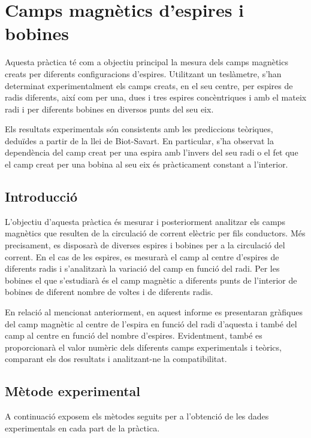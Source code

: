 \chapter{Camps magnètics d'espires i bobines}
\begin{resum}
	Aquesta pràctica té com a objectiu principal la mesura dels camps magnètics creats per diferents configuracions d'espires. Utilitzant un teslàmetre, s'han determinat experimentalment els camps creats, en el seu centre, per espires de radis diferents, així com per una, dues i tres espires concèntriques i amb el mateix radi i per diferents bobines en diversos punts del seu eix.

	Els resultats experimentals són consistents amb les prediccions teòriques, deduïdes a partir de la llei de Biot-Savart. En particular, s'ha observat la dependència del camp creat per una espira amb l'invers del seu radi o el fet que el camp creat per una bobina al seu eix és pràcticament constant a l'interior.
\end{resum}

\section{Introducció}
L'objectiu d'aquesta pràctica és mesurar i posteriorment analitzar els camps magnètics que resulten de la circulació de corrent elèctric per fils conductors. Més precisament, es disposarà de diverses espires i bobines per a la circulació del corrent. En el cas de les espires, es mesurarà el camp al centre d'espires de diferents radis i s'analitzarà la variació del camp en funció del radi. Per les bobines el que s'estudiarà és el camp magnètic a diferents punts de l'interior de bobines de diferent nombre de voltes i de diferents radis.

En relació al mencionat anteriorment, en aquest informe es presentaran gràfiques del camp magnètic al centre de l'espira en funció del radi d'aquesta i també del camp al centre en funció del nombre d'espires. Evidentment, també es proporcionarà el valor numèric dels diferents camps experimentals i teòrics, comparant els dos resultats i analitzant-ne la compatibilitat.

\section{Mètode experimental}
A continuació exposem els mètodes seguits per a l'obtenció de les dades experimentals en cada part de la pràctica.

